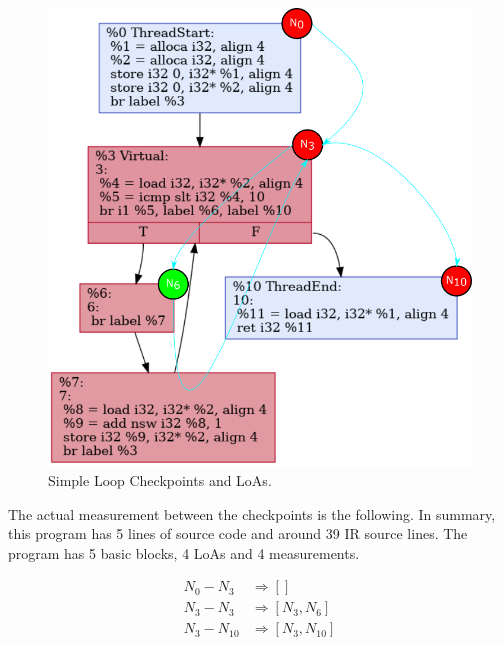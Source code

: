\begin{figure}[ht]
    \centerline{\includegraphics[scale=.60]{Figures/05/simple-loop-loa.png}}
    \caption{Simple Loop Checkpoints and LoAs.} 
    \label{fig:simple-loop-loa}
\end{figure}

The actual measurement between the checkpoints is the following. In summary,
this program has 5 lines of source code and around 39 IR source lines. The
program has 5 basic blocks, 4 LoAs and 4 measurements.

\begin{align*}  
    N_0 - N_3 &\Rightarrow [] \\
    N_3 - N_3 &\Rightarrow [N_3, N_6] \\
    N_3 - N_{10} &\Rightarrow [N_3, N_{10}] \\
\end{align*}

